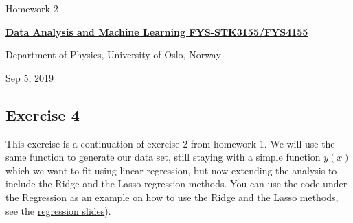 \documentclass[%
oneside,                 %
final,                   %
10pt]{article}
\begin{document}

\newcommand{\exercisesection}[1]{\subsection*{#1}}






\thispagestyle{empty}

\begin{center}
{\LARGE\bf
\begin{spacing}{1.25}
Homework 2
\end{spacing}
}
\end{center}


\begin{center}
{\bf \href{{http://www.uio.no/studier/emner/matnat/fys/FYS3155/index-eng.html}}{Data Analysis and Machine Learning FYS-STK3155/FYS4155}}
\end{center}

    \begin{center}
\centerline{{\small Department of Physics, University of Oslo, Norway}}
\end{center}
    

\begin{center}
Sep 5, 2019
\end{center}

\vspace{1cm}


\subsection{Exercise 4}

This exercise is a continuation of exercise 2 from homework 1. We will
use the same function to generate our data set, still staying with a
simple function $y(x)$ which we want to fit using linear regression,
but now extending the analysis to include the Ridge and the Lasso
regression methods. You can use the code under the Regression as an example on how to use the Ridge and the Lasso methods, see the \href{{https://compphysics.github.io/MachineLearning/doc/pub/Regression/html/Regression-bs.html}}{regression slides}). 
\end{document}
